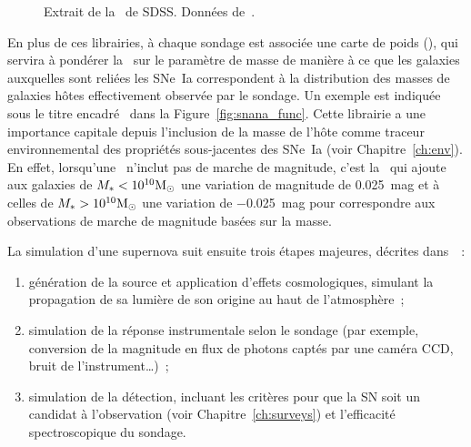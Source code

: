 \documentclass[../main/main.tex]{subfiles}
\begin{document}
\begin{figure}[ht]
    \centering
    \begin{minipage}{0.75\linewidth}
    \end{minipage}
    \caption[Extrait de la \simlib\ de SDSS]{Extrait de la \simlib\ de SDSS.
    Données de~\cite{kessler2013}.}
    \label{fig:sdssimlib}
\end{figure}

En plus de ces librairies, à chaque sondage est associée une carte de poids
(\wgtmap), qui servira à pondérer la \hostlib\ sur le paramètre de masse de
manière à ce que les galaxies auxquelles sont reliées les SNe~Ia correspondent à
la distribution des masses de galaxies hôtes effectivement observée par le
sondage. Un exemple est indiquée sous le titre encadré \wgtmap\ dans la
Figure~\ref{fig:snana_func}. Cette librairie a une importance capitale depuis
l'inclusion de la masse de l'hôte comme traceur environnemental des propriétés
sous-jacentes des SNe~Ia (voir Chapitre~\ref{ch:env}). En effet, lorsqu'une
\hostlib\ n'inclut pas de marche de magnitude, c'est la \wgtmap\ qui ajoute aux
galaxies de $M_* < 10^{10}\si{\Msun}$ une variation de magnitude de
\SI{0.025}{mag} et à celles de $M_* > 10^{10}\si{\Msun}$ une variation de
\SI{-0.025}{mag} pour correspondre aux observations de marche de magnitude
basées sur la masse.

La simulation d'une supernova suit ensuite trois étapes majeures, décrites
dans~\cite{kessler2019}~:
\begin{enumerate}
    \item génération de la source et application d'effets cosmologiques,
        simulant la propagation de sa lumière de son origine au haut de
        l'atmosphère~;
    \item simulation de la réponse instrumentale selon le sondage (par exemple,
        conversion de la magnitude en flux de photons captés par une caméra CCD,
        bruit de l'instrument…)~;
    \item simulation de la détection, incluant les critères pour que la SN soit
        un candidat à l'observation (voir Chapitre~\ref{ch:surveys}) et
        l'efficacité spectroscopique du sondage.
\end{enumerate}
\end{document}
